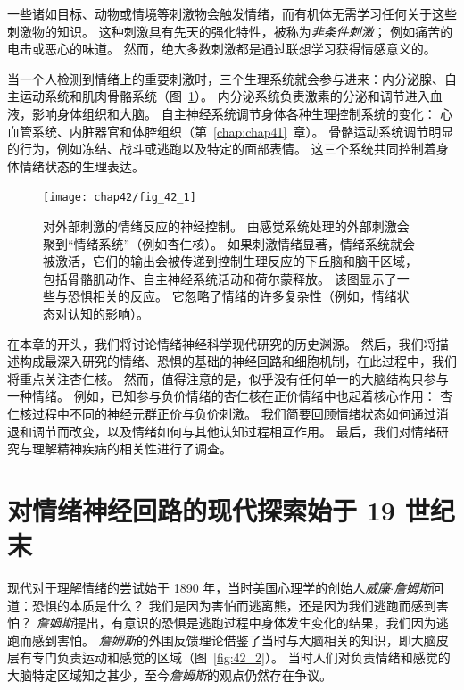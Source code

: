 一些诸如目标、动物或情境等刺激物会触发情绪，而有机体无需学习任何关于这些刺激物的知识。
这种刺激具有先天的强化特性，被称为\textit{非条件刺激}；
例如痛苦的电击或恶心的味道。
然而，绝大多数刺激都是通过联想学习获得情感意义的。


当一个人检测到情绪上的重要刺激时，三个生理系统就会参与进来：内分泌腺、自主运动系统和肌肉骨骼系统（图~\ref{fig:42_1}）。
内分泌系统负责激素的分泌和调节进入血液，影响身体组织和大脑。
自主神经系统调节身体各种生理控制系统的变化：
心血管系统、内脏器官和体腔组织（第~\ref{chap:chap41}~章）。
骨骼运动系统调节明显的行为，例如冻结、战斗或逃跑以及特定的面部表情。
这三个系统共同控制着身体情绪状态的生理表达。


\begin{figure}[htbp]
	\centering
	\texttt{[image: chap42/fig\_42\_1]}
	\caption{对外部刺激的情绪反应的神经控制。
		由感觉系统处理的外部刺激会聚到“情绪系统”（例如杏仁核）。
		如果刺激情绪显著，情绪系统就会被激活，它们的输出会被传递到控制生理反应的下丘脑和脑干区域，包括骨骼肌动作、自主神经系统活动和荷尔蒙释放。
		该图显示了一些与恐惧相关的反应。
		它忽略了情绪的许多复杂性（例如，情绪状态对认知的影响）。}
	\label{fig:42_1}
\end{figure}


在本章的开头，我们将讨论情绪神经科学现代研究的历史渊源。
然后，我们将描述构成最深入研究的情绪、恐惧的基础的神经回路和细胞机制，在此过程中，我们将重点关注杏仁核。
然而，值得注意的是，似乎没有任何单一的大脑结构只参与一种情绪。
例如，已知参与负价情绪的杏仁核在正价情绪中也起着核心作用：
杏仁核过程中不同的神经元群正价与负价刺激。
我们简要回顾情绪状态如何通过消退和调节而改变，以及情绪如何与其他认知过程相互作用。
最后，我们对情绪研究与理解精神疾病的相关性进行了调查。



\section{对情绪神经回路的现代探索始于 19 世纪末}
现代对于理解情绪的尝试始于 1890 年，当时美国心理学的创始人\textit{威廉$\cdot$詹姆斯}问道：恐惧的本质是什么？
我们是因为害怕而逃离熊，还是因为我们逃跑而感到害怕？
\textit{詹姆斯}提出，有意识的恐惧是逃跑过程中身体发生变化的结果，我们因为逃跑而感到害怕。
\textit{詹姆斯}的外围反馈理论借鉴了当时与大脑相关的知识，即大脑皮层有专门负责运动和感觉的区域（图~\ref{fig:42_2}）。
当时人们对负责情绪和感觉的大脑特定区域知之甚少，至今\textit{詹姆斯}的观点仍然存在争议。


